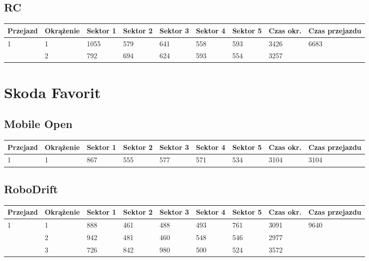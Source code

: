 \documentclass[11pt]{article}
\begin{document}
\subsection{RC}
\begin{table}[h]
\begin{tabular}{|l|l|l|l|l|l|l|l|l|}
\hline
 Przejazd        & Okrążenie & Sektor 1 & Sektor 2 & Sektor 3 & Sektor 4 & Sektor 5 & Czas okr. & Czas przejazdu    \\ \hline
\multirow{2}{*}{1}& 1 &1055& 579& 641& 558& 593& 3426& \multirow{2}{*}{6683} \\ \cline{2-8}
& 2& 792& 694& 624& 593& 554& 3257& \\ \hline
\end{tabular}
\end{table}
\pagebreak
\section{Skoda Favorit}
\subsection{Mobile Open}
\begin{table}[h]
\begin{tabular}{|l|l|l|l|l|l|l|l|l|}
\hline
   Przejazd        & Okrążenie & Sektor 1 & Sektor 2 & Sektor 3 & Sektor 4 & Sektor 5 & Czas okr. & Czas przejazdu    \\ \hline
\multirow{1}{*}{1}& 1 &867& 555& 577& 571& 534& 3104& 3104\\ \hline
\end{tabular}
\end{table}
\subsection{RoboDrift}
\begin{table}[h]
\begin{tabular}{|l|l|l|l|l|l|l|l|l|}
\hline
   Przejazd        & Okrążenie & Sektor 1 & Sektor 2 & Sektor 3 & Sektor 4 & Sektor 5 & Czas okr. & Czas przejazdu    \\ \hline
\multirow{3}{*}{1}& 1 &888& 461& 488& 493& 761& 3091& \multirow{3}{*}{9640} \\ \cline{2-8}
& 2& 942& 481& 460& 548& 546& 2977& \\ \cline{2-8}
& 3& 726& 842& 980& 500& 524& 3572& \\ \hline
\end{tabular}
\end{table}
\end{document}
